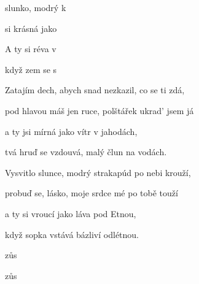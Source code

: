 

  

\zs
{} slunko, modrý  k    

 si krásná jako   

A ty si   réva v 

když zem se  s  
\ks

\zs
{Zatajím} dech, abych snad {nezkazil,} {co} se ti {zdá,}

{pod} hlavou máš jen ruce, {polštářek} {ukrad'} jsem {já}

a ty jsi {mírná} {jako} vítr v {jahodách,}

tvá hruď se {vzdouvá}, {malý} člun {na} vodách.
\ks

\zs
{Vysvitlo} slunce, modrý {strakapúd} {po} nebi {krouží,}

{probuď} se, lásko, moje {srdce} mé {po} tobě {touží}

a ty si {vroucí} {jako} láva {pod} Etnou,

když sopka {vstává} {bázliví} {odlétnou.}
\ks

  zůs

  zůs

  

\kp





